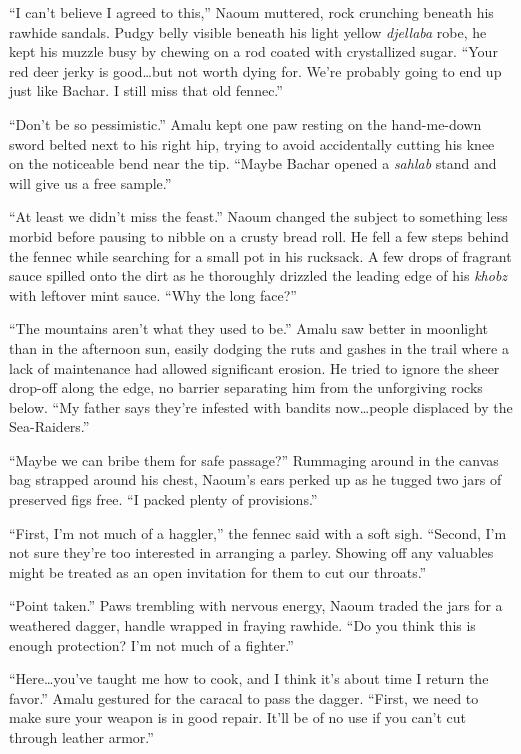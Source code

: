 ``I can't believe I agreed to this,'' Naoum muttered, rock crunching beneath his rawhide sandals. Pudgy belly visible beneath his light yellow \emph{djellaba} robe, he kept his muzzle busy by chewing on a rod coated with crystallized sugar. ``Your red deer jerky is good\ldots but not worth dying for. We're probably going to end up just like Bachar. I still miss that old fennec.''

``Don't be so pessimistic.'' Amalu kept one paw resting on the hand-me-down sword belted next to his right hip, trying to avoid accidentally cutting his knee on the noticeable bend near the tip. ``Maybe Bachar opened a \emph{sahlab} stand and will give us a free sample.''

``At least we didn't miss the feast.'' Naoum changed the subject to something less morbid before pausing to nibble on a crusty bread roll. He fell a few steps behind the fennec while searching for a small pot in his rucksack. A few drops of fragrant sauce spilled onto the dirt as he thoroughly drizzled the leading edge of his \emph{khobz} with leftover mint sauce. ``Why the long face?''

``The mountains aren't what they used to be.'' Amalu saw better in moonlight than in the afternoon sun, easily dodging the ruts and gashes in the trail where a lack of maintenance had allowed significant erosion. He tried to ignore the sheer drop-off along the edge, no barrier separating him from the unforgiving rocks below. ``My father says they're infested with bandits now\ldots people displaced by the Sea-Raiders.''

``Maybe we can bribe them for safe passage?'' Rummaging around in the canvas bag strapped around his chest, Naoum's ears perked up as he tugged two jars of preserved figs free. ``I packed plenty of provisions.''

``First, I'm not much of a haggler,'' the fennec said with a soft sigh. ``Second, I'm not sure they're too interested in arranging a parley. Showing off any valuables might be treated as an open invitation for them to cut our throats.''

``Point taken.'' Paws trembling with nervous energy, Naoum traded the jars for a weathered dagger, handle wrapped in fraying rawhide. ``Do you think this is enough protection? I'm not much of a fighter.''

``Here\ldots you've taught me how to cook, and I think it's about time I return the favor.'' Amalu gestured for the caracal to pass the dagger. ``First, we need to make sure your weapon is in good repair. It'll be of no use if you can't cut through leather armor.''

